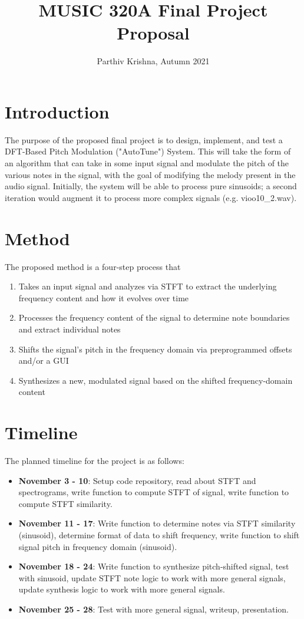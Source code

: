 \documentclass{article}
\title{MUSIC 320A Final Project Proposal}
\author{Parthiv Krishna, Autumn 2021}
\date{}
\begin{document}
\maketitle

\section{Introduction}

The purpose of the proposed final project is to design, implement, and test a DFT-Based Pitch Modulation ("AutoTune") System. This will take the form of an algorithm that can take in some input signal and modulate the pitch of the various notes in the signal, with the goal of modifying the melody present in the audio signal. Initially, the system will be able to process pure sinusoids; a second iteration would augment it to process more complex signals (e.g. vioo10\_2.wav).

\section{Method}

The proposed method is a four-step process that 

\begin{enumerate}
    \item Takes an input signal and analyzes via STFT to extract the underlying frequency content and how it evolves over time
    \item Processes the frequency content of the signal to determine note boundaries and extract individual notes
    \item Shifts the signal’s pitch in the frequency domain via preprogrammed offsets and/or a GUI 
    \item Synthesizes a new, modulated signal based on the shifted frequency-domain content

\end{enumerate}

\section{Timeline}
The planned timeline for the project is as follows:
\begin{itemize}
    \item \textbf{November 3 - 10}: Setup code repository, read about STFT and spectrograms, write function to compute STFT of signal, write function to compute STFT similarity.
    \item \textbf{November 11 - 17}: Write function to determine notes via STFT similarity (sinusoid), determine format of data to shift frequency, write function to shift signal pitch in frequency domain (sinusoid).
    \item \textbf{November 18 - 24}: Write function to synthesize pitch-shifted signal, test with sinusoid, update STFT note logic to work with more general signals, update synthesis logic to work with more general signals.
    \item \textbf{November 25 - 28}: Test with more general signal, writeup, presentation.
    
\end{itemize}
\end{document}
